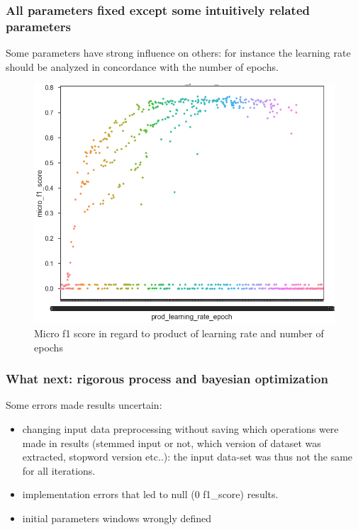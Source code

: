 \subsubsection{All parameters fixed except some intuitively related parameters}
Some parameters have strong influence on others: for instance the learning rate should be analyzed in concordance with the number of epochs.

\begin{figure}[H]
\centering
\includegraphics[scale=0.4]{./images/tuning/tuning-lr-epoch.png}
\caption{Micro f1 score in regard to product of learning rate and number of epochs}
\end{figure}

\subsubsection{What next: rigorous process and bayesian optimization}

Some errors made results uncertain:
\begin{itemize}
\item changing input data preprocessing without saving which operations were made in results (stemmed input or not, which version of dataset was extracted, stopword version etc..): the input data-set was thus not the same for all iterations.
\item implementation errors that led to null (0 f1\_score) results.
\item initial parameters windows wrongly defined
\end{itemize}

